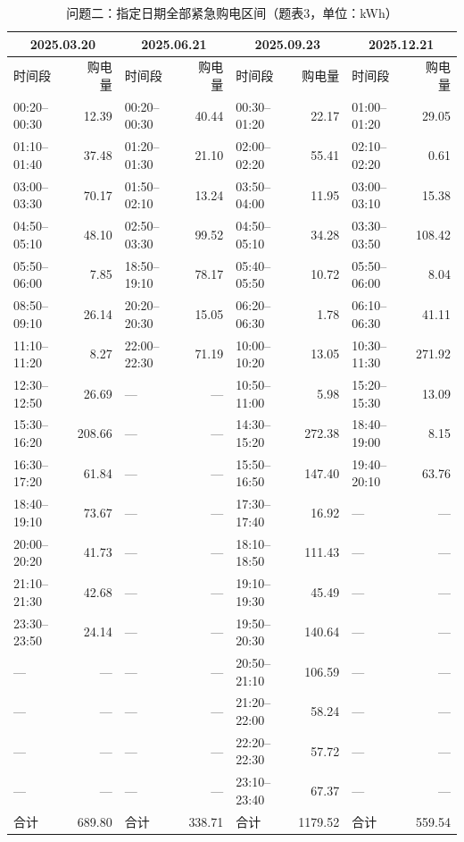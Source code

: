 \FloatBarrier
\begin{table}[H]
\centering\footnotesize
\setlength{\tabcolsep}{2.5pt}
\caption{问题二：指定日期全部紧急购电区间（题表3，单位：kWh）}
\label{tab:required-q2-emergency}
\begin{tabular}{@{}lrlrlrlr@{}}
\toprule
\multicolumn{2}{c}{2025.03.20} & \multicolumn{2}{c}{2025.06.21} & \multicolumn{2}{c}{2025.09.23} & \multicolumn{2}{c}{2025.12.21} \\
\midrule
时间段 & 购电量 & 时间段 & 购电量 & 时间段 & 购电量 & 时间段 & 购电量 \\
\midrule
00:20--00:30 & 12.39 & 00:20--00:30 & 40.44 & 00:30--01:20 & 22.17 & 01:00--01:20 & 29.05 \\
01:10--01:40 & 37.48 & 01:20--01:30 & 21.10 & 02:00--02:20 & 55.41 & 02:10--02:20 & 0.61 \\
03:00--03:30 & 70.17 & 01:50--02:10 & 13.24 & 03:50--04:00 & 11.95 & 03:00--03:10 & 15.38 \\
04:50--05:10 & 48.10 & 02:50--03:30 & 99.52 & 04:50--05:10 & 34.28 & 03:30--03:50 & 108.42 \\
05:50--06:00 & 7.85 & 18:50--19:10 & 78.17 & 05:40--05:50 & 10.72 & 05:50--06:00 & 8.04 \\
08:50--09:10 & 26.14 & 20:20--20:30 & 15.05 & 06:20--06:30 & 1.78 & 06:10--06:30 & 41.11 \\
11:10--11:20 & 8.27 & 22:00--22:30 & 71.19 & 10:00--10:20 & 13.05 & 10:30--11:30 & 271.92 \\
12:30--12:50 & 26.69 & — & — & 10:50--11:00 & 5.98 & 15:20--15:30 & 13.09 \\
15:30--16:20 & 208.66 & — & — & 14:30--15:20 & 272.38 & 18:40--19:00 & 8.15 \\
16:30--17:20 & 61.84 & — & — & 15:50--16:50 & 147.40 & 19:40--20:10 & 63.76 \\
18:40--19:10 & 73.67 & — & — & 17:30--17:40 & 16.92 & — & — \\
20:00--20:20 & 41.73 & — & — & 18:10--18:50 & 111.43 & — & — \\
21:10--21:30 & 42.68 & — & — & 19:10--19:30 & 45.49 & — & — \\
23:30--23:50 & 24.14 & — & — & 19:50--20:30 & 140.64 & — & — \\
— & — & — & — & 20:50--21:10 & 106.59 & — & — \\
— & — & — & — & 21:20--22:00 & 58.24 & — & — \\
— & — & — & — & 22:20--22:30 & 57.72 & — & — \\
— & — & — & — & 23:10--23:40 & 67.37 & — & — \\
合计 & 689.80 & 合计 & 338.71 & 合计 & 1179.52 & 合计 & 559.54 \\
\bottomrule
\end{tabular}
\end{table}

